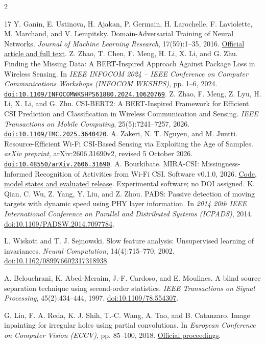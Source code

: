 \documentclass[a4paper,11pt,fleqn]{mira-author}
\begin{document}
\begin{multicols}{2}
\begin{thebibliography}{17}
Y. Ganin, E. Ustinova, H. Ajakan, P. Germain, H. Larochelle, F. Laviolette, M. Marchand, and V. Lempitsky. Domain-Adversarial Training of Neural Networks. \textit{Journal of Machine Learning Research}, 17(59):1--35, 2016. \href{https://jmlr.org/papers/v17/15-239.html}{Official article and full text}.
Z. Zhao, T. Chen, F. Meng, H. Li, X. Li, and G. Zhu. Finding the Missing Data: A BERT-Inspired Approach Against Package Loss in Wireless Sensing. In \textit{IEEE INFOCOM 2024 -- IEEE Conference on Computer Communications Workshops (INFOCOM WKSHPS)}, pp. 1--6, 2024. \href{https://doi.org/10.1109/INFOCOMWKSHPS61880.2024.10620769}{\nolinkurl{doi:10.1109/INFOCOMWKSHPS61880.2024.10620769}}.
Z. Zhao, F. Meng, Z. Lyu, H. Li, X. Li, and G. Zhu. CSI-BERT2: A BERT-Inspired Framework for Efficient CSI Prediction and Classification in Wireless Communication and Sensing. \textit{IEEE Transactions on Mobile Computing}, 25(5):7241--7257, 2026. \href{https://doi.org/10.1109/TMC.2025.3640420}{\nolinkurl{doi:10.1109/TMC.2025.3640420}}.
A. Zakeri, N. T. Nguyen, and M. Juntti. Resource-Efficient Wi-Fi CSI-Based Sensing via Exploiting the Age of Samples. \textit{arXiv preprint}, arXiv:2606.31690v2, revised 5 October 2026. \href{https://doi.org/10.48550/arXiv.2606.31690}{\nolinkurl{doi:10.48550/arXiv.2606.31690}}.
A. Bourkibate. MIRA-CSI: Missingness-Informed Recognition of Activities from Wi-Fi CSI. Software v0.1.0, 2026. \href{https://github.com/ABDESSAMAD-BOURKIBATE/mira-csi/releases/tag/v0.1.0}{Code, model states and evaluated release}. Experimental software; no DOI assigned.
K. Qian, C. Wu, Z. Yang, Y. Liu, and Z. Zhou.
PADS: Passive detection of moving targets with dynamic speed using PHY layer
information. In \textit{2014 20th IEEE International Conference on Parallel
and Distributed Systems (ICPADS)}, 2014.
\href{https://doi.org/10.1109/PADSW.2014.7097784}{doi:10.1109/PADSW.2014.7097784}.

L. Wiskott and T. J. Sejnowski.
Slow feature analysis: Unsupervised learning of invariances.
\textit{Neural Computation}, 14(4):715--770, 2002.
\href{https://doi.org/10.1162/089976602317318938}{doi:10.1162/089976602317318938}.

A. Belouchrani, K. Abed-Meraim, J.-F. Cardoso, and E. Moulines.
A blind source separation technique using second-order statistics.
\textit{IEEE Transactions on Signal Processing}, 45(2):434--444, 1997.
\href{https://doi.org/10.1109/78.554307}{doi:10.1109/78.554307}.

G. Liu, F. A. Reda, K. J. Shih, T.-C. Wang, A. Tao, and B. Catanzaro.
Image inpainting for irregular holes using partial convolutions.
In \textit{European Conference on Computer Vision (ECCV)}, pp. 85--100, 2018.
\href{https://www.ecva.net/papers/eccv_2018/papers_ECCV/html/Guilin_Liu_Image_Inpainting_for_ECCV_2018_paper.php}{Official proceedings}.
\end{thebibliography}
\end{multicols}
\endgroup
\end{document}
